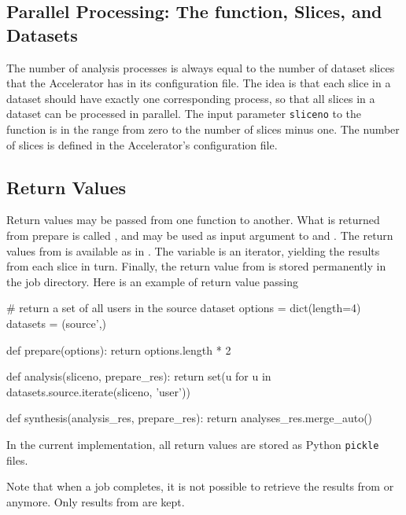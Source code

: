 \subsection{Parallel Processing:  The \analysis function, Slices, and Datasets}

The number of analysis processes is always equal to the number of
dataset slices that the Accelerator has in its configuration file.
The idea is that each slice in a dataset should have exactly one
corresponding \analysis process, so that all slices in a dataset can
be processed in parallel.  The input parameter \texttt{sliceno} to
the \analysis function is in the range from zero to the number of
slices minus one.  The number of slices is defined in the
Accelerator's configuration file.



\subsection{Return Values}
Return values may be passed from one function to another.  What is
returned from prepare is called \prepareres, and may be used as input
argument to \analysis and \synthesis.  The return values from
\analysis is available as \analysisres in \synthesis.  The
\analysisres variable is an iterator, yielding the results from each
slice in turn.  Finally, the return value from \synthesis is stored
permanently in the job directory.  Here is an example of return value
passing
\begin{python}
# return a set of all users in the source dataset
options = dict(length=4)
datasets = (source',)

def prepare(options):
    return options.length * 2

def analysis(sliceno, prepare_res):
    return set(u for u in datasets.source.iterate(sliceno, 'user'))

def synthesis(analysis_res, prepare_res):
     return analyses_res.merge_auto()
\end{python}
In the current implementation, all return values are stored as Python
\texttt{pickle} files.

Note that when a job completes, it is not possible to retrieve the
results from \prepare or \analysis anymore.  Only results from
\synthesis are kept.


